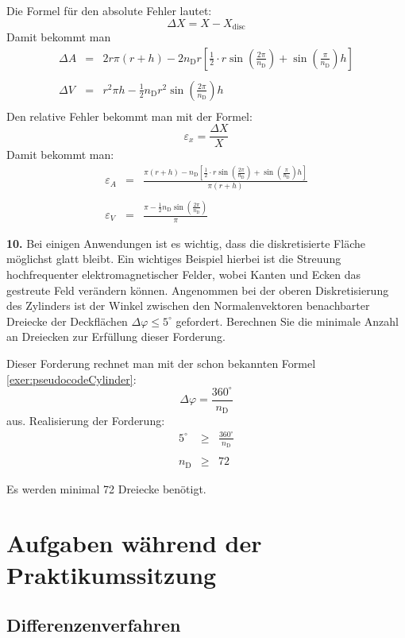 \documentclass[Protokollheft.tex]{subfiles}
\begin{document}
	Die Formel für den absolute Fehler lautet:\\
	$$\Delta X = X- X_\text{disc}$$
	Damit bekommt man
	\begin{eqnarray*}
		\Delta A&=&2 r \pi (r+h) -2n_\text{D}r\left[ \frac12 \cdot r \sin\left(\frac{2 \pi}{n_\text{D}}\right)+ \sin\left(\frac{\pi}{n_\text{D}}\right)h  \right]\\
		\\
		\Delta V&=&r^2\pi h -\frac12 n_\text{D} r^2 \sin\left(\frac{ 2\pi}{n_\text{D}}\right)h\\
	\end{eqnarray*}
	Den relative Fehler bekommt man mit der Formel:
	$$\varepsilon_{x}=\frac{\Delta X}{X}$$
	Damit bekommt man:
	\begin{eqnarray*}
		\varepsilon_{A}&=&\frac{ \pi (r+h) -n_\text{D}\left[ \frac12 \cdot r \sin\left(\frac{2 \pi}{n_\text{D}}\right)+ \sin\left(\frac{\pi}{n_\text{D}}\right)h  \right]}{\pi (r+h)}\\
		\\
		\varepsilon_{V}&=&\frac{\pi  -\frac12 n_\text{D}  \sin\left(\frac{ 2\pi}{n_\text{D}}\right)}{\pi}
	\end{eqnarray*}
	\begin{framed}
		\noindent \textbf{10.} Bei einigen Anwendungen ist es wichtig, dass die diskretisierte Fläche möglichst glatt bleibt. Ein
		wichtiges Beispiel hierbei ist die Streuung hochfrequenter elektromagnetischer Felder, wobei
		Kanten und Ecken das gestreute Feld verändern können. Angenommen bei der oberen
		Diskretisierung des Zylinders ist der Winkel zwischen den Normalenvektoren benachbarter Dreiecke der Deckflächen $\Delta \varphi \leq 5^{\circ}$ gefordert.
		Berechnen Sie die minimale Anzahl an Dreiecken zur Erfüllung dieser Forderung.\label{exer:smoothArea}
	\end{framed}
	\noindent
	Dieser Forderung rechnet man mit der schon bekannten Formel
	\ref{exer:pseudocodeCylinder}:
	$$\Delta \varphi = \frac{360^\circ}{n_\text{D}}$$ aus. 
	Realisierung der Forderung:
	\begin{eqnarray*}
		5^{\circ} &\geq& \frac{360^\circ}{n_\text{D}}\\
		\\
		n_\text{D} &\geq& 72
	\end{eqnarray*}
	
	Es werden minimal 72 Dreiecke benötigt.
	
	\section{Aufgaben während der Praktikumssitzung}
	{\subsection{Differenzenverfahren}}
	
\end{document}
